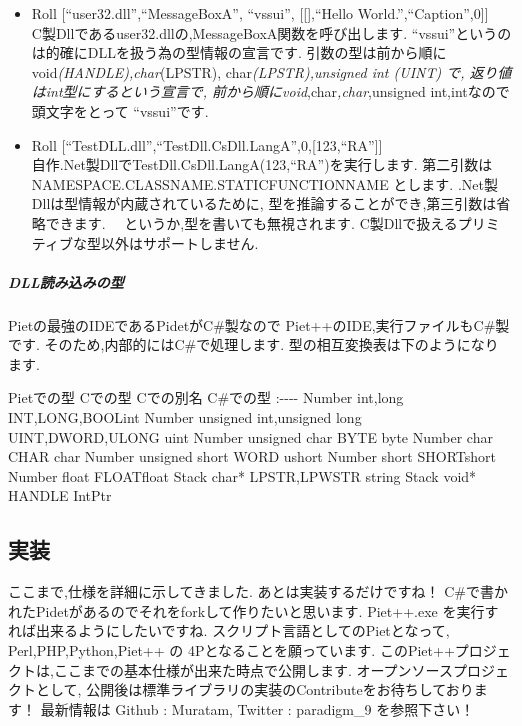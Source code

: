 \begin{itemize}
\item
  Roll {[}``user32.dll'',``MessageBoxA'', ``vssui'', {[}{[}{]},``Hello
  World.'',``Caption'',0{]}{]}\\C製Dllであるuser32.dllの,MessageBoxA関数を呼び出します.
  ``vssui''というのは的確にDLLを扱う為の型情報の宣言です.
  引数の型は前から順に void\emph{(HANDLE),char}(LPSTR),
  char\emph{(LPSTR),unsigned int (UINT) で,
  返り値はint型にするという宣言で,
  前から順にvoid},char\emph{,char},unsigned int,intなので 頭文字をとって
  ``vssui''です.
\item
  Roll
  {[}``TestDLL.dll'',``TestDll.CsDll.LangA'',0,{[}123,``RA''{]}{]}\\自作.Net製DllでTestDll.CsDll.LangA(123,``RA'')を実行します.
  第二引数は NAMESPACE.CLASSNAME.STATICFUNCTIONNAME とします.
  .Net製Dllは型情報が内蔵されているために,
  型を推論することができ,第三引数は省略できます.
  　というか,型を書いても無視されます.
  C製Dllで扱えるプリミティブな型以外はサポートしません.
\end{itemize}

\subparagraph{DLL読み込みの型}

Pietの最強のIDEであるPidetがC\#製なので
Piet++のIDE,実行ファイルもC\#製です. そのため,内部的にはC\#で処理します.
型の相互変換表は下のようになります.

\textbar{} Pietでの型 \textbar{} Cでの型 \textbar{} Cでの別名 \textbar{}
C\#での型\textbar{}
\textbar{}:-\textbar{}-\textbar{}-\textbar{}-\textbar{} \textbar{}
Number \textbar{} int,long \textbar{} INT,LONG,BOOL\textbar{}int
\textbar{} \textbar{} Number \textbar{} unsigned int,unsigned long
\textbar{} UINT,DWORD,ULONG \textbar{}uint\textbar{} \textbar{} Number
\textbar{} unsigned char\textbar{} BYTE \textbar{}byte\textbar{}
\textbar{} Number \textbar{} char \textbar{} CHAR
\textbar{}char\textbar{} \textbar{} Number \textbar{} unsigned short
\textbar{} WORD \textbar{}ushort\textbar{} \textbar{} Number \textbar{}
short\textbar{} SHORT\textbar{}short \textbar{} \textbar{} Number
\textbar{} float\textbar{} FLOAT\textbar{}float \textbar{} \textbar{}
Stack\textbar{} char* \textbar{} LPSTR,LPWSTR \textbar{}string\textbar{}
\textbar{} Stack\textbar{} void* \textbar{} HANDLE
\textbar{}IntPtr\textbar{}

\subsection{実装}

ここまで,仕様を詳細に示してきました. あとは実装するだけですね！
C\#で書かれたPidetがあるのでそれをforkして作りたいと思います. Piet++.exe
を実行すれば出来るようにしたいですね.
スクリプト言語としてのPietとなって, Perl,PHP,Python,Piet++ の
4Pとなることを願っています.
このPiet++プロジェクトは,ここまでの基本仕様が出来た時点で公開します.
オープンソースプロジェクトとして,
公開後は標準ライブラリの実装のContributeをお待ちしております！ 最新情報は
Github : Muratam, Twitter : paradigm\_9 を参照下さい！
